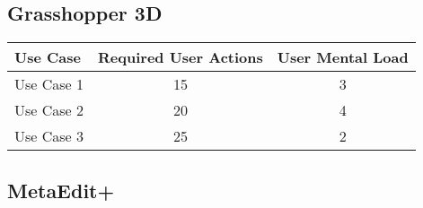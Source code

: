 \subsection{Grasshopper 3D}




\begin{tabular*}{\textwidth}{lcc}
\textbf{Use Case} & \textbf{Required User Actions} & \textbf{User Mental Load}\\
\hline
Use Case 1                          & 15 & 3 \\
Use Case 2                          & 20 & 4 \\
Use Case 3                          & 25 & 2
\end{tabular*}

\subsection{MetaEdit+}




